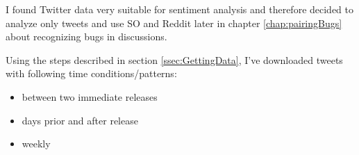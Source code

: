 I found Twitter data very suitable for sentiment analysis and therefore decided to analyze only tweets and use SO and Reddit later in chapter \ref{chap:pairingBugs}  about recognizing bugs in discussions.

Using the steps described in section \ref{ssec:GettingData}, I've downloaded tweets with following time conditions/patterns:
\begin{itemize}
\item between two immediate releases
\item days prior and after release
\item weekly
\end{itemize}

